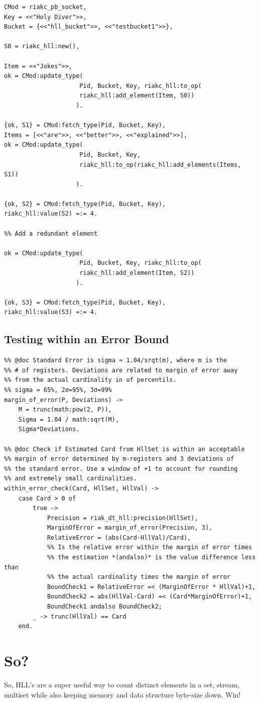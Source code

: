 \documentclass[12pt]{article}
\begin{document}
\begin{lstlisting}
CMod = riakc_pb_socket,
Key = <<"Holy Diver">>,
Bucket = {<<"hll_bucket">>, <<"testbucket1">>},

S0 = riakc_hll:new(),

Item = <<"Jokes">>,
ok = CMod:update_type(
                     Pid, Bucket, Key, riakc_hll:to_op(
                     riakc_hll:add_element(Item, S0))
                    ).

{ok, S1} = CMod:fetch_type(Pid, Bucket, Key),
Items = [<<"are">>, <<"better">>, <<"explained">>],
ok = CMod:update_type(
                     Pid, Bucket, Key,
                     riakc_hll:to_op(riakc_hll:add_elements(Items, S1))
                    ).

{ok, S2} = CMod:fetch_type(Pid, Bucket, Key),
riakc_hll:value(S2) =:= 4.

%% Add a redundant element

ok = CMod:update_type(
                     Pid, Bucket, Key, riakc_hll:to_op(
                     riakc_hll:add_element(Item, S2))
                    ).

{ok, S3} = CMod:fetch_type(Pid, Bucket, Key),
riakc_hll:value(S3) =:= 4.
\end{lstlisting}

\subsection{Testing within an Error Bound}

\begin{lstlisting}
%% @doc Standard Error is sigma ≈ 1.04/srqt(m), where m is the
%% # of registers. Deviations are related to margin of error away
%% from the actual cardinality in of percentils.
%% sigma = 65%, 2σ=95%, 3σ=99%
margin_of_error(P, Deviations) ->
    M = trunc(math:pow(2, P)),
    Sigma = 1.04 / math:sqrt(M),
    Sigma*Deviations.

%% @doc Check if Estimated Card from HllSet is within an acceptable
%% margin of error determined by m-registers and 3 deviations of
%% the standard error. Use a window of +1 to account for rounding
%% and extremely small cardinalities.
within_error_check(Card, HllSet, HllVal) ->
    case Card > 0 of
        true ->
            Precision = riak_dt_hll:precision(HllSet),
            MarginOfError = margin_of_error(Precision, 3),
            RelativeError = (abs(Card-HllVal)/Card),
            %% Is the relative error within the margin of error times
            %% the estimation *(andalso)* is the value difference less than
            %% the actual cardinality times the margin of error
            BoundCheck1 = RelativeError =< (MarginOfError * HllVal)+1,
            BoundCheck2 = abs(HllVal-Card) =< (Card*MarginOfError)+1,
            BoundCheck1 andalso BoundCheck2;
        _ -> trunc(HllVal) == Card
    end.
\end{lstlisting}

\section{So?}

So, HLL's are a super useful way to count distinct elements in a set, stream,
multiset while also keeping memory and data structure byte-size down. Win!

\printbibliography
\end{document}
